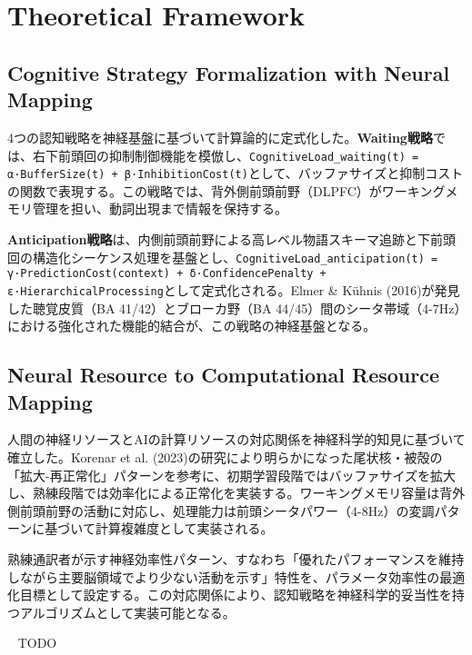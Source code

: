 \section{Theoretical Framework}

\subsection{Cognitive Strategy Formalization with Neural Mapping}

4つの認知戦略を神経基盤に基づいて計算論的に定式化した。\textbf{Waiting戦略}では、右下前頭回の抑制制御機能を模倣し、\texttt{CognitiveLoad\_waiting(t) = α·BufferSize(t) + β·InhibitionCost(t)}として、バッファサイズと抑制コストの関数で表現する。この戦略では、背外側前頭前野（DLPFC）がワーキングメモリ管理を担い、動詞出現まで情報を保持する。

\textbf{Anticipation戦略}は、内側前頭前野による高レベル物語スキーマ追跡と下前頭回の構造化シーケンス処理を基盤とし、\texttt{CognitiveLoad\_anticipation(t) = γ·PredictionCost(context) + δ·ConfidencePenalty + ε·HierarchicalProcessing}として定式化される。Elmer \& Kühnis (2016)が発見した聴覚皮質（BA 41/42）とブローカ野（BA 44/45）間のシータ帯域（4-7Hz）における強化された機能的結合が、この戦略の神経基盤となる。 


\subsection{Neural Resource to Computational Resource Mapping}

人間の神経リソースとAIの計算リソースの対応関係を神経科学的知見に基づいて確立した。Korenar et al. (2023)の研究により明らかになった尾状核・被殻の「拡大-再正常化」パターンを参考に、初期学習段階ではバッファサイズを拡大し、熟練段階では効率化による正常化を実装する。ワーキングメモリ容量は背外側前頭前野の活動に対応し、処理能力は前頭シータパワー（4-8Hz）の変調パターンに基づいて計算複雑度として実装される。

熟練通訳者が示す神経効率性パターン、すなわち「優れたパフォーマンスを維持しながら主要脳領域でより少ない活動を示す」特性を、パラメータ効率性の最適化目標として設定する。この対応関係により、認知戦略を神経科学的妥当性を持つアルゴリズムとして実装可能となる。 

 
TODO

